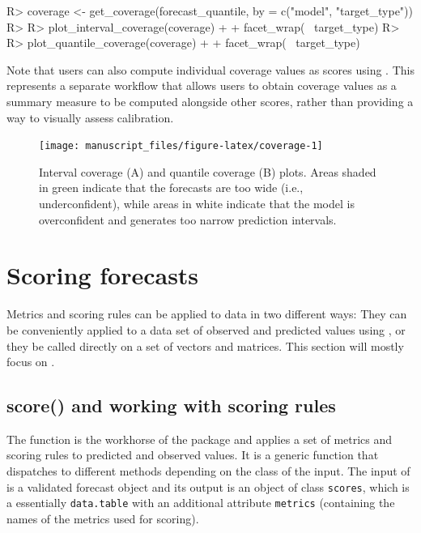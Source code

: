 \documentclass[
]{jss}
\begin{document}
\begin{CodeChunk}
\begin{CodeInput}
R> coverage <- get_coverage(forecast_quantile, by = c("model", "target_type")) 
R> 
R> plot_interval_coverage(coverage) + 
+   facet_wrap(~ target_type)
R> 
R> plot_quantile_coverage(coverage) + 
+   facet_wrap(~ target_type)
\end{CodeInput}
\end{CodeChunk}

Note that users can also compute individual coverage values as scores
using . This represents a separate workflow that allows
users to obtain coverage values as a summary measure to be computed
alongside other scores, rather than providing a way to visually assess
calibration.

\begin{CodeChunk}
\begin{figure}[!h]

{\centering \texttt{[image: manuscript\_files/figure-latex/coverage-1]} 

}

\caption[Interval coverage (A) and quantile coverage (B) plots]{Interval coverage (A) and quantile coverage (B) plots. Areas shaded in green indicate that the forecasts are too wide (i.e., underconfident), while areas in white indicate that the model is overconfident and generates too narrow prediction intervals.}\label{fig:coverage}
\end{figure}
\end{CodeChunk}

\section{Scoring forecasts} \label{sec:scoring}

Metrics and scoring rules can be applied to data in two different ways:
They can be conveniently applied to a data set of observed and predicted
values using , or they be called directly on a set of
vectors and matrices. This section will mostly focus on .

\subsection{score() and working with scoring
rules}\label{score-and-working-with-scoring-rules}

The function  is the workhorse of the package and applies
a set of metrics and scoring rules to predicted and observed values. It
is a generic function that dispatches to different methods depending on
the class of the input. The input of  is a validated
forecast object and its output is an object of class \texttt{scores},
which is a essentially \texttt{data.table} with an additional attribute
\texttt{metrics} (containing the names of the metrics used for scoring).
\end{document}
